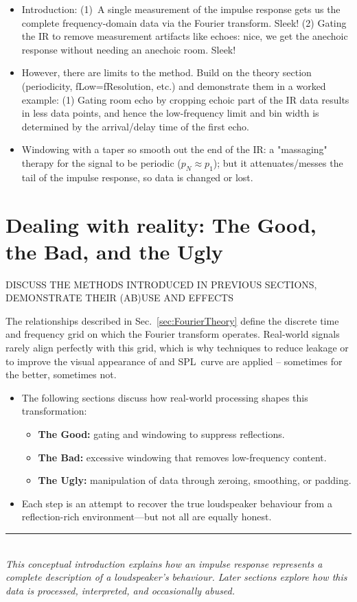 \documentclass[12pt,a4paper]{article}
\providecommand{\secn}[1]{Sec.~\ref{sec:#1}}
\begin{document}
\begin{itemize}[noitemsep]
\item Introduction: (1) A single measurement of the impulse response gets us the complete frequency-domain data via the Fourier transform. Sleek! (2) Gating the IR to remove measurement artifacts like echoes: nice, we get the anechoic response without needing an anechoic room. Sleek!
    \item However, there are limits to the method. Build on the theory section (periodicity, fLow=fResolution, etc.) and demonstrate them in a worked example: (1) Gating room echo by cropping echoic part of the IR data results in less data points, and hence the low-frequency limit and bin width is determined by the arrival/delay time of the first echo.
    \item Windowing with a taper so smooth out the end of the IR: a "massaging" therapy for the signal to be periodic ($p_N \approx p_1$); but it attenuates/messes the tail of the impulse response, so data is changed or lost.
\end{itemize}


\section{Dealing with reality: The Good, the Bad, and the Ugly}
DISCUSS THE METHODS INTRODUCED IN PREVIOUS SECTIONS, DEMONSTRATE THEIR (AB)USE AND EFFECTS 

The relationships described in \secn{FourierTheory} define the discrete time and frequency grid on which the Fourier transform operates. Real-world signals rarely align perfectly with this grid, which is why techniques to reduce leakage or to improve the visual appearance of and SPL curve are applied -- sometimes for the better, sometimes not.

\begin{itemize}[noitemsep]
    \item The following sections discuss how real-world processing shapes this transformation:
    \begin{itemize}
        \item \textbf{The Good:} gating and windowing to suppress reflections.
        \item \textbf{The Bad:} excessive windowing that removes low-frequency content.
        \item \textbf{The Ugly:} manipulation of data through zeroing, smoothing, or padding.
    \end{itemize}
    \item Each step is an attempt to recover the true loudspeaker behaviour from a reflection-rich environment—but not all are equally honest.
\end{itemize}

\vspace{1em}
\noindent\rule{\textwidth}{0.4pt}\\
\textit{This conceptual introduction explains how an impulse response represents a complete description of a loudspeaker’s behaviour. Later sections explore how this data is processed, interpreted, and occasionally abused.}
\end{document}
